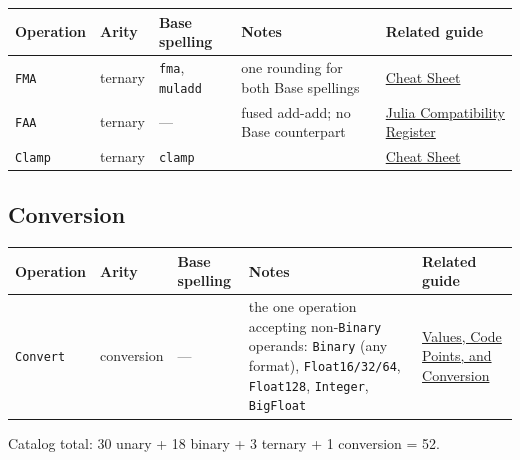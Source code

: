 \label{1836852574804533888-dup1}{}



\begin{table}[h]
\centering
\begin{tabulary}{\linewidth}{L L L L L}
\toprule
Operation & Arity & Base spelling & Notes & Related guide \\
\toprule
\texttt{FMA} & ternary & \texttt{fma}, \texttt{muladd} & one rounding for both Base spellings & \href{help\_\allowbreak{}cheat\_\allowbreak{}sheet.md}{Cheat Sheet} \\
\texttt{FAA} & ternary & — & fused add-add; no Base counterpart & \href{reference\_\allowbreak{}julia\_\allowbreak{}compat.md}{Julia Compatibility Register} \\
\texttt{Clamp} & ternary & \texttt{clamp} &  & \href{help\_\allowbreak{}cheat\_\allowbreak{}sheet.md}{Cheat Sheet} \\
\bottomrule
\end{tabulary}

\end{table}



\subsection{Conversion}



\label{87850402300235514}{}



\begin{table}[h]
\centering
\begin{tabulary}{\linewidth}{L L L L L}
\toprule
Operation & Arity & Base spelling & Notes & Related guide \\
\toprule
\texttt{Convert} & conversion & — & the one operation accepting non-\texttt{Binary} operands: \texttt{Binary} (any format), \texttt{Float16/32/64}, \texttt{Float128}, \texttt{Integer}, \texttt{BigFloat} & \href{concept\_\allowbreak{}values\_\allowbreak{}codepoints.md}{Values, Code Points, and Conversion} \\
\bottomrule
\end{tabulary}

\end{table}



Catalog total: 30 unary + 18 binary + 3 ternary + 1 conversion = 52.



